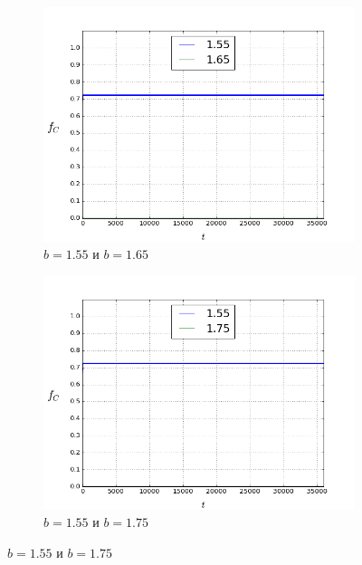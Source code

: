 \documentclass[a4paper]{article}
\begin{document}
\begin{figure}
	
	\begin{subfigure}{.5\textwidth}
		\includegraphics[width=.8\linewidth]{155-165.png}
		\caption{$b=1.55$ и $b=1.65$}
	\end{subfigure}
	\begin{subfigure}{.5\textwidth}
		\includegraphics[width=.8\linewidth]{155-175.png}
		\caption{$b=1.55$ и $b=1.75$}
	\end{subfigure}%
	

\end{figure}
\end{document}
